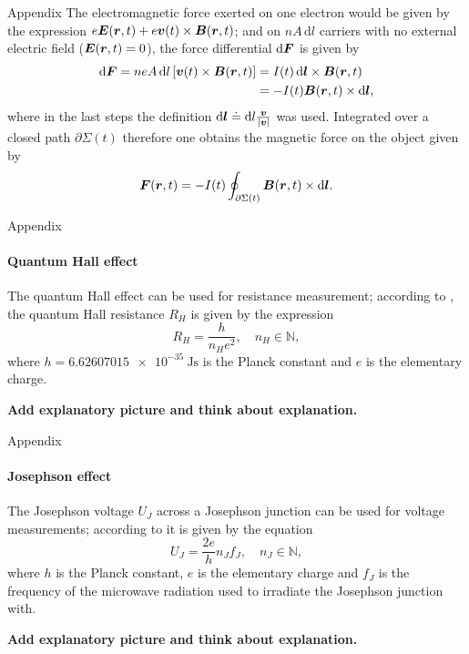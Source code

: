\documentclass{beamer}
\begin{document}
\begin{frame}[allowframebreaks]{Appendix}
 The electromagnetic force exerted on one electron would be given by the expression $e\bm{E}(\bm{r},t) + e\bm{v}(t) \times \bm{B}(\bm{r},t)$; and on $nA\,\mathrm{d}l$ carriers with no external electric field ($\bm{E}(\bm{r},t) = 0$), the force differential $\mathrm{d}\bm{F}$ is given by 
 \begin{align}\begin{aligned}
		\mathrm{d}\bm{F} = neA\,\mathrm{d}l \left[\bm{v}(t)\times \bm{B}(\bm{r},t)\right] &= I(t)\,\mathrm{d}\bm{l}\times \bm{B}(\bm{r},t) \\ &= -I(t)\bm{B}(\bm{r},t)\times \mathrm{d}\bm{l},
	\end{aligned}\end{align} where in the last steps the definition $\mathrm{d}\bm{l} \doteq \mathrm{d}l\frac{\bm{v}}{|\bm{v}|}$ was used. Integrated over a closed path $\partial \Sigma(t)$ therefore one obtains the magnetic force on the object given by \begin{equation}\label{eq:watt_bal_fund_eq_2}
	\bm{F}(\bm{r},t) = -I(t)\oint_{\partial \Sigma(t)} \bm{B}(\bm{r},t)\times \mathrm{d}\bm{l}.
	\end{equation}
\end{frame}

\begin{frame}[allowframebreaks]{Appendix}
\framesubtitle{Quantum Hall effect}
\justifying
	The quantum Hall effect can be used for resistance measurement; according to \cite{B_Jeckelmann_2001}, the quantum Hall resistance $R_H$ is given by the expression \begin{equation}\label{eq:quantumhalleffect}
		R_H = \frac{h}{n_He^2}, \quad n_H \in \mathbb{N},
	\end{equation} where $h = \SI{6.62607015e-35}{\joule\second}$ is the Planck constant and $e$ is the elementary charge.

 \textbf{Add explanatory picture and think about explanation.}
\end{frame}

\begin{frame}[allowframebreaks]{Appendix}
\framesubtitle{Josephson effect}
\justifying
	The Josephson voltage $U_J$ across a Josephson junction can be used for voltage measurements; according to \cite{Kajastie_2009} it is given by the equation \begin{equation}\label{eq:josephsoneffect}
		U_J = \frac{2e}{h}n_Jf_J, \quad n_J \in \mathbb{N},
	\end{equation} where $h$ is the Planck constant, $e$ is the elementary charge and $f_J$ is the frequency of the microwave radiation used to irradiate the Josephson junction with.

\textbf{Add explanatory picture and think about explanation.}
\end{frame}
\end{document}
